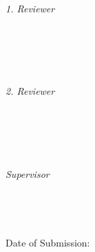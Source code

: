 \begin{titlepage}
  \centering

  \vfill
  {\large \thesisSubject} \\[5mm]
  {\LARGE \color{ctcolortitle}\textbf{\thesisTitle} \\[10mm]}
  {\Large \thesisName} \\

  \vfill
  \begin{minipage}[t]{.27\textwidth}
    \raggedleft
    \textit{1. Reviewer}
  \end{minipage}
  \hspace*{15pt}
  \begin{minipage}[t]{.65\textwidth}
    {\Large \thesisFirstReviewer} \\
    {\small \thesisFirstReviewerDepartment} \\[-1mm]
    {\small \thesisFirstReviewerUniversity}
  \end{minipage} \\[5mm]
  \begin{minipage}[t]{.27\textwidth}
    \raggedleft
    \textit{2. Reviewer}
  \end{minipage}
  \hspace*{15pt}
  \begin{minipage}[t]{.65\textwidth}
    {\Large \thesisSecondReviewer} \\
    {\small \thesisSecondReviewerDepartment} \\[-1mm]
    {\small \thesisSecondReviewerUniversity}
  \end{minipage} \\[10mm]
  \begin{minipage}[t]{.27\textwidth}
    \raggedleft
    \textit{Supervisor}
  \end{minipage}
  \hspace*{15pt}
  \begin{minipage}[t]{.65\textwidth}
    \thesisFirstSupervisor\ %
  \end{minipage} \\[10mm]

  \vspace{2cm}
  \begin{flushright}
    Date of Submission: \thesisDate \\
  \end{flushright}


\end{titlepage}
